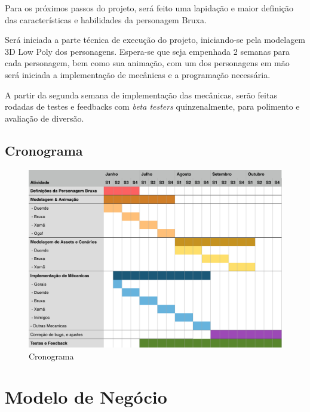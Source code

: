 Para os próximos passos do projeto, será feito uma lapidação e maior definição das características e habilidades da personagem Bruxa.

Será iniciada a parte técnica de execução do projeto, iniciando-se pela modelagem 3D Low Poly dos personagens. Espera-se que seja empenhada 2 semanas para cada personagem, bem como sua animação, com um dos personagens em mão será iniciada a implementação de mecânicas e a programação necessária.

A partir da segunda semana de implementação das mecânicas, serão feitas rodadas de testes e feedbacks com \textit{beta testers} quinzenalmente, para polimento e avaliação de diversão.


\section{Cronograma}

\begin{figure}[!htb] \caption{\label{fig_crono}Cronograma} \begin{center}
\includegraphics[width=\textwidth]{imagens/crono.png} \end{center}
 \end{figure}

\chapter{Modelo de Negócio}



